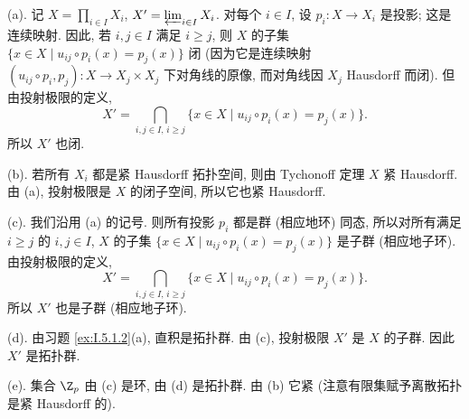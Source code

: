 \begin{solution}
(a). 记 $X = \prod_{i \in I} X_i$, $X' = \varprojlim_{i \in I} X_i$. 对每个 $i \in I$, 设 $p_i \colon X \to X_i$ 是投影; 这是连续映射. 因此, 若 $i, j \in I$ 满足 $i \geq j$, 则 $X$ 的子集 $\{x \in X \mid u_{ij} \circ p_i(x) = p_j(x)\}$ 闭 (因为它是连续映射 $(u_{ij} \circ p_i, p_j) \colon X \to X_j \times X_j$ 下对角线的原像, 而对角线因 $X_j$ Hausdorff 而闭). 但由投射极限的定义,
\[
X' = \bigcap_{i,j \in I,\, i \geq j}\{x \in X \mid u_{ij} \circ p_i(x) = p_j(x)\}.
\]
所以 $X'$ 也闭.

(b). 若所有 $X_i$ 都是紧 Hausdorff 拓扑空间, 则由 Tychonoff 定理 $X$ 紧 Hausdorff. 由 (a), 投射极限是 $X$ 的闭子空间, 所以它也紧 Hausdorff.

(c). 我们沿用 (a) 的记号. 则所有投影 $p_i$ 都是群 (相应地环) 同态, 所以对所有满足 $i \geq j$ 的 $i, j \in I$, $X$ 的子集 $\{x \in X \mid u_{ij} \circ p_i(x) = p_j(x)\}$ 是子群 (相应地子环). 由投射极限的定义,
\[
X' = \bigcap_{i,j \in I,\, i \geq j}\{x \in X \mid u_{ij} \circ p_i(x) = p_j(x)\}.
\]
所以 $X'$ 也是子群 (相应地子环).

(d). 由习题 \ref{ex:I.5.1.2}(a), 直积是拓扑群. 由 (c), 投射极限 $X'$ 是 $X$ 的子群. 因此 $X'$ 是拓扑群.

(e). 集合 $\Z_p$ 由 (c) 是环, 由 (d) 是拓扑群. 由 (b) 它紧 (注意有限集赋予离散拓扑是紧 Hausdorff 的).
\end{solution}

